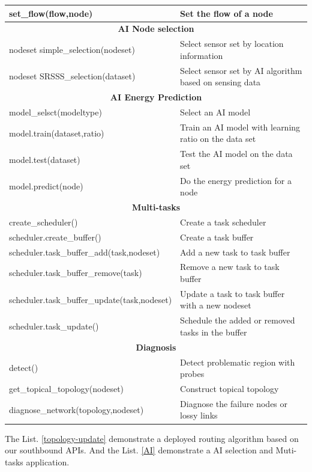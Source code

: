 \begin{table}[htbp]
{\begin{tabular}{|l|l|}
		\hline
		set\_flow(flow,node) & Set the flow of a node \\
		\hline
		\multicolumn{2}{|c|}{\textbf{AI Node selection}}\\
		\hline
		nodeset simple\_selection(nodeset) & Select sensor set by location information\\
		\hline
		nodeset SRSSS\_selection(dataset) & Select sensor set by AI algorithm based on sensing data\\
		\hline
		\multicolumn{2}{|c|}{\textbf{AI Energy Prediction}}\\
		\hline
		model\_selsct(modeltype) & Select an AI model\\
		\hline
		model.train(dataset,ratio) & Train an AI model with learning ratio on the data set\\
		\hline
		model.test(dataset) & Test the AI model on the data set\\
		\hline
		model.predict(node) & Do the energy prediction for a node \\
		\hline
		\multicolumn{2}{|c|}{\textbf{Multi-tasks}}\\
		\hline
		create\_scheduler() & Create a task scheduler \\
		\hline
		scheduler.create\_buffer() & Create a task buffer \\
		\hline
		scheduler.task\_buffer\_add(task,nodeset) & Add a new task to task buffer \\
		\hline
		scheduler.task\_buffer\_remove(task) & Remove a new task to task buffer \\
		\hline
		scheduler.task\_buffer\_update(task,nodeset) & Update a task to task buffer with a new nodeset \\
		\hline
		scheduler.task\_update() & Schedule the added or removed tasks in the buffer\\
		\hline
		\multicolumn{2}{|c|}{\textbf{Diagnosis}}\\
		\hline
		detect() & Detect problematic region with probes \\
		\hline
		get\_topical\_topology(nodeset) & Construct topical topology\\
		\hline
		diagnose\_network(topology,nodeset) & Diagnose the failure nodes or lossy links\\
		\hline
	\end{tabular}
	}
\end{table}

The List. \ref{topology-update} demonstrate a deployed routing algorithm based on our southbound APIs. 
And the List. \ref{AI} demonstrate a AI selection and Muti-tasks application.

